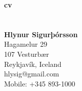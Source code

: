 \documentclass[margin]{res}
\begin{document}
\begin{figure}
	\hspace{-3.4cm}
	\begin{minipage}[b]{0.70\linewidth}
		{\Huge\bf cv\\\\\\
			\large\bf Hlynur Sigurþórsson}\\
		Hagamelur 29\\
		107 Vesturbær\\
        Reykjavík, Iceland\\
		hlysig@gmail.com\\
		Mobile: +345 893-1000\\
	\end{minipage}
\end{figure}
\begin{resume}
    
\end{resume}
\end{document}
